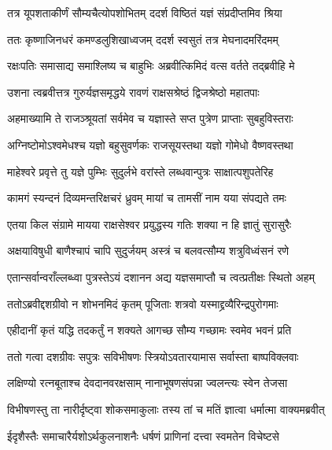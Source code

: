 \twolineshloka
{तत्र यूपशताकीर्णं सौम्यचैत्योपशोभितम्}
{ददर्श विष्ठितं यज्ञं संप्रदीप्तमिव श्रिया} %

\twolineshloka
{ततः कृष्णाजिनधरं कमण्डलुशिखाध्वजम्}
{ददर्श स्वसुतं तत्र मेघनादमरिंदमम्} %

\twolineshloka
{रक्षःपतिः समासाद्य समाश्लिष्य च बाहुभिः}
{अब्रवीत्किमिदं वत्स वर्तते तद्ब्रवीहि मे} %

\twolineshloka
{उशना त्वब्रवीत्तत्र गुरुर्यज्ञसमृद्धये}
{रावणं राक्षसश्रेष्ठं द्विजश्रेष्ठो महातपाः} %

\twolineshloka
{अहमाख्यामि ते राजञ्श्रूयतां सर्वमेव च}
{यज्ञास्ते सप्त पुत्रेण प्राप्ताः सुबहुविस्तराः} %

\twolineshloka
{अग्निष्टोमोऽश्वमेधश्च यज्ञो बहुसुवर्णकः}
{राजसूयस्तथा यज्ञो गोमेधो वैष्णवस्तथा} %

\twolineshloka
{माहेश्वरे प्रवृत्ते तु यज्ञे पुम्भिः सुदुर्लभे}
{वरांस्ते लब्धवान्पुत्रः साक्षात्पशुपतेरिह} %

\twolineshloka
{कामगं स्यन्दनं दिव्यमन्तरिक्षचरं ध्रुवम्}
{मायां च तामसीं नाम यया संपद्यते तमः} %

\twolineshloka
{एतया किल संग्रामे मायया राक्षसेश्वर}
{प्रयुद्धस्य गतिः शक्या न हि ज्ञातुं सुरासुरैः} %

\twolineshloka
{अक्षयाविषुधी बाणैश्चापं चापि सुदुर्जयम्}
{अस्त्रं च बलवत्सौम्य शत्रुविध्वंसनं रणे} %

\twolineshloka
{एतान्सर्वान्वराँल्लब्ध्वा पुत्रस्तेऽयं दशानन}
{अद्य यज्ञसमाप्तौ च त्वत्प्रतीक्षः स्थितो अहम्} %

\twolineshloka
{ततोऽब्रवीद्दशग्रीवो न शोभनमिदं कृतम्}
{पूजिताः शत्रवो यस्माद्द्रव्यैरिन्द्रपुरोगमाः} %

\twolineshloka
{एहीदानीं कृतं यद्धि तदकर्तुं न शक्यते}
{आगच्छ सौम्य गच्छामः स्वमेव भवनं प्रति} %

\twolineshloka
{ततो गत्वा दशग्रीवः सपुत्रः सविभीषणः}
{स्त्रियोऽवतारयामास सर्वास्ता बाष्पविक्लवाः} %

\twolineshloka
{लक्षिण्यो रत्नबूताश्च देवदानवरक्षसाम्}
{नानाभूषणसंपन्ना ज्वलन्त्यः स्वेन तेजसा} %

\twolineshloka
{विभीषणस्तु ता नारीर्दृष्ट्वा शोकसमाकुलाः}
{तस्य तां च मतिं ज्ञात्वा धर्मात्मा वाक्यमब्रवीत्} %

\twolineshloka
{ईदृशैस्तैः समाचारैर्यशोऽर्थकुलनाशनैः}
{धर्षणं प्राणिनां दत्त्वा स्वमतेन विचेष्टसे} %

